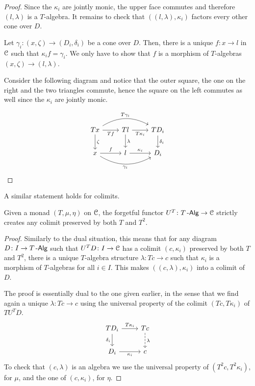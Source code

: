 \documentclass[a4paper,11pt,oneside,openany]{scrbook}
\begin{document}
\begin{proof}
	Since the $\kappa_i$ are jointly monic, the upper face commutes and therefore $(l,\lambda)$ is a $T$-algebra. It remains to check that $((l,\lambda),\kappa_i)$ factors every other cone over $D$.

	Let $\gamma_i\colon(x,\zeta)\rightarrow (D_i,\delta_i)$ be a cone over $D$. Then, there is a unique $f\colon x\rightarrow l$ in $\operatorname{\mathcal{C}}$ such that $\kappa_if=\gamma_i$. We only have to show that $f$ is a morphism of $T$-algebras $(x,\zeta)\rightarrow (l,\lambda)$.

	Consider the following diagram and notice that the outer square, the one on the right and the two triangles commute, hence the square on the left commutes as well since the $\kappa_i$ are jointly monic.

	\[
		\begin{tikzcd}
			Tx\ar[rr, bend left, "T\gamma_i"]\ar[r, swap, "Tf"]\ar[d, "\zeta"]
			& Tl\ar[r, swap, "T\kappa_i"]\ar[d, "\lambda"]
			& TD_i\ar[d, "\delta_i"] \\
			x\ar[r, "f"]\ar[rr, bend right, swap, "\gamma_i"]
			& l\ar[r, "\kappa_i"]
			& D_i
		\end{tikzcd}
	\]
\end{proof}

A similar statement holds for colimits.

\begin{prop}\label{create colims}
	Given a monad $(T,\mu,\eta)$ on $\operatorname{\mathcal{C}}$, the forgetful functor $U^T\colon T\operatorname{-\mathsf{Alg}}\rightarrow\operatorname{\mathcal{C}}$ strictly creates any colimit preserved by both $T$ and $T^2$.
\end{prop}

\begin{proof}
	Similarly to the dual situation, this means that for any diagram $D\colon I\rightarrow T\operatorname{-\mathsf{Alg}}$ such that $U^TD\colon I\rightarrow\operatorname{\mathcal{C}}$ has a colimit $(c,\kappa_i)$ preserved by both $T$ and $T^2$, there is a unique $T$-algebra structure $\lambda\colon Tc\rightarrow c$ such that $\kappa_i$ is a morphism of $T$-algebras for all $i\in I$. This makes $((c,\lambda),\kappa_i)$ into a colimit of $D$.

	The proof is essentially dual to the one given earlier, in the sense that we
	find again a unique $\lambda\colon Tc\rightarrow c$ using the universal
	property of the colimit $(Tc,T\kappa_i)$ of $TU^TD$.
	\[
		\begin{tikzcd}
			TD_i\ar[r, "T\kappa_i"]\ar[d, "\delta_i"']
			& Tc\ar[d, dashed, "\lambda"] \\
			D_i\ar[r, "\kappa_i"']
			& c
		\end{tikzcd}
	\]
	To check that $(c,\lambda)$ is an algebra we use the universal property of $(T^2c,T^2\kappa_i)$, for $\mu$, and the one of $(c,\kappa_i)$, for $\eta$.
\end{proof}
\end{document}
